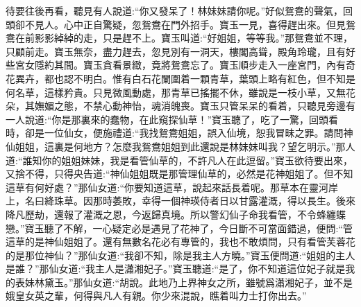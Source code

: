 \begin{parag}
    待要往後再看，聽見有人說道:“你又發呆了！林妹妹請你呢。”好似鴛鴦的聲氣，回頭卻不見人。心中正自驚疑，忽鴛鴦在門外招手。寶玉一見，喜得趕出來。但見鴛鴦在前影影綽綽的走，只是趕不上。寶玉叫道:“好姐姐，等等我。”那鴛鴦並不理，只顧前走。寶玉無奈，盡力趕去，忽見別有一洞天，樓閣高聳，殿角玲瓏，且有好些宮女隱約其間。寶玉貪看景緻，竟將鴛鴦忘了。寶玉順步走入一座宮門，內有奇花異卉，都也認不明白。惟有白石花闌圍着一顆青草，葉頭上略有紅色，但不知是何名草，這樣矜貴。只見微風動處，那青草已搖擺不休，雖說是一枝小草，又無花朵，其嫵媚之態，不禁心動神怡，魂消魄喪。寶玉只管呆呆的看着，只聽見旁邊有一人說道:“你是那裏來的蠢物，在此窺探仙草！”寶玉聽了，吃了一驚，回頭看時，卻是一位仙女，便施禮道:“我找鴛鴦姐姐，誤入仙境，恕我冒昧之罪。請問神仙姐姐，這裏是何地方？怎麼我鴛鴦姐姐到此還說是林妹妹叫我？望乞明示。”那人道:“誰知你的姐姐妹妹，我是看管仙草的，不許凡人在此逗留。”寶玉欲待要出來，又捨不得，只得央告道:“神仙姐姐既是那管理仙草的，必然是花神姐姐了。但不知這草有何好處？”那仙女道:“你要知道這草，說起來話長着呢。那草本在靈河岸上，名曰絳珠草。因那時萎敗，幸得一個神瑛侍者日以甘露灌溉，得以長生。後來降凡歷劫，還報了灌溉之恩，今返歸真境。所以警幻仙子命我看管，不令蜂纏蝶戀。”寶玉聽了不解，一心疑定必是遇見了花神了，今日斷不可當面錯過，便問:“管這草的是神仙姐姐了。還有無數名花必有專管的，我也不敢煩問，只有看管芙蓉花的是那位神仙？”那仙女道:“我卻不知，除是我主人方曉。”寶玉便問道:“姐姐的主人是誰？”那仙女道:“我主人是瀟湘妃子。”寶玉聽道:“是了，你不知道這位妃子就是我的表妹林黛玉。”那仙女道:“胡說。此地乃上界神女之所，雖號爲瀟湘妃子，並不是娥皇女英之輩，何得與凡人有親。你少來混說，瞧着叫力士打你出去。”
\end{parag}


